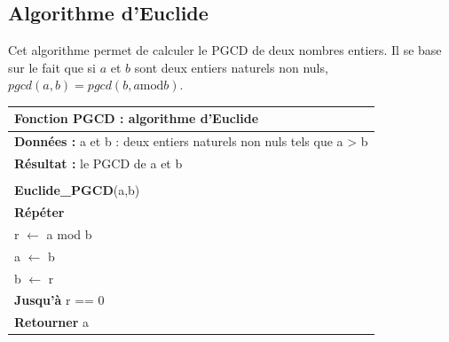 \documentclass[10pt]{article}
\begin{document}
\subsection{Algorithme d'Euclide}
Cet algorithme permet de calculer le PGCD de deux nombres entiers. Il se base sur le fait que si $a$ et $b$ sont deux entiers naturels non nuls, $pgcd(a,b)=pgcd(b, a \text{mod} b)$. 

\begin{minipage}[c]{.48\linewidth}
\begin{pseudo}
\begin{tabular}{p{}}
\hline
Fonction PGCD : algorithme d’Euclide \\
\hline
\textbf{Données :} a et b : deux entiers naturels non nuls tels que a > b \\
\textbf{Résultat :} le PGCD de a et b \\
\\
\textbf{Euclide\_PGCD}(a,b) \\
\hspace{.5cm}\textbf{Répéter}\\
\hspace{1cm}r $\leftarrow$ a mod b\\
\hspace{1cm}a $\leftarrow$ b \\
\hspace{1cm}b $\leftarrow$ r \\
\hspace{.5cm}\textbf{Jusqu’à} r == 0 \\
\hspace{.5cm}\textbf{Retourner} a\\
\hline
\end{tabular}
\end{pseudo}
\end{minipage} \hfill
\end{document}
